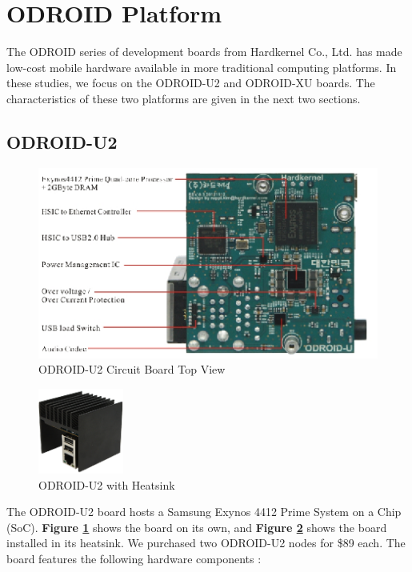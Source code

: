 \documentclass[11pt]{book}
\begin{document}
\section{\textbf{ODROID Platform}}

The ODROID series of development boards from Hardkernel Co., Ltd. has made
low-cost mobile hardware available in more traditional computing platforms. In
these studies, we focus on the ODROID-U2 and ODROID-XU boards. The
characteristics of these two platforms are given in the next two sections.

\subsection{\textbf{ODROID-U2}}

\begin{figure}[h]
\includegraphics[width=\textwidth]{odroid_u2_top}
\caption{ODROID-U2 Circuit Board Top View \cite{odroid-u2-board-detail}}
\label{odroid-u2-board}
\end{figure}

\begin{figure}[h]
\centering
\includegraphics[width=0.25\textwidth]{odroid_u2}
\caption{ODROID-U2 with Heatsink \cite{odroid-u2-board-detail}}
\label{odroid-u2}
\end{figure}

The ODROID-U2 board hosts a Samsung Exynos 4412 Prime System on a Chip
(SoC). \textbf{Figure \ref{odroid-u2-board}} shows the board on its own, and
\textbf{Figure \ref{odroid-u2}} shows the board installed in its heatsink. We
purchased two ODROID-U2 nodes for \$89 each. The board features the following
hardware components \cite{odroid-u2-board-detail}:
\end{document}
